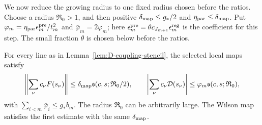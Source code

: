 We now reduce the growing radius to one fixed radius chosen before the ratios. Choose a radius $\mathfrak R_0>1$, and then positive $\delta_{\rm map}\le g_*/2$ and $\eta_{\rm par}\le\delta_{\rm map}$. Put $\varphi_m=\eta_{\rm par}\epsilon^{\rm pre}_m/t_m^2$ and $\bar\varphi_m=2\varphi_m$; here $\epsilon^{\rm pre}_m=\theta c_{J_{m+1}}\epsilon_m^{\rm reg}$ is the coefficient for this step. The small fraction $\theta$ is chosen below before the ratios.
\begin{lemma}\label{lem:D-real-lines}
For every line as in Lemma~\ref{lem:D-coupling-stencil}, the selected local maps satisfy
\begin{equation}\label{eq:D-stencil-bound}
\left\|\sum_\nu c_\nu F(s_\nu)\right\|\le\delta_{\rm map}\mathfrak s(c,s;\mathfrak R_0/2),\qquad
\left|\sum_\nu c_\nu\mathcal D(s_\nu)\right|\le\varphi_m\mathfrak s(c,s;\mathfrak R_0),
\end{equation}
with $\sum_{i<m}\bar\varphi_i\le g_*b_m$. The radius $\mathfrak R_0$ can be arbitrarily large. The Wilson map satisfies the first estimate with the same $\delta_{\rm map}$.
\end{lemma}
